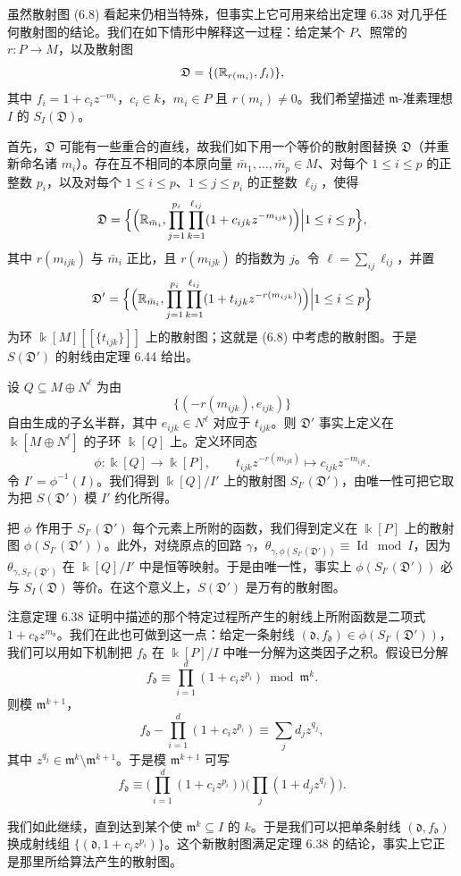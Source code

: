 \begin{remark}
虽然散射图 (6.8) 看起来仍相当特殊，但事实上它可用来给出定理 6.38 对几乎任何散射图的结论。我们在如下情形中解释这一过程：给定某个 $P$、照常的 $r:P\to M$，以及散射图
\[
\mathfrak{D}=\{(\mathbb{R}_{r(m_i)},f_i)\},
\]
其中 $f_i=1+c_iz^{-m_i}$，$c_i\in k$，$m_i\in P$ 且 $r(m_i)\ne0$。我们希望描述 $\mathfrak{m}$-准素理想 $I$ 的 $S_I(\mathfrak{D})$。

首先，$\mathfrak{D}$ 可能有一些重合的直线，故我们如下用一个等价的散射图替换 $\mathfrak{D}$（并重新命名诸 $m_i$）。存在互不相同的本原向量 $\bar m_1,\dots,\bar m_p\in M$、对每个 $1\le i\le p$ 的正整数 $p_i$，以及对每个 $1\le i\le p$、$1\le j\le p_i$ 的正整数 $\ell_{ij}$，使得
\[
\mathfrak{D}=\Big\{\Big(\mathbb{R}_{\bar m_i},\prod_{j=1}^{p_i}\prod_{k=1}^{\ell_{ij}}(1+c_{ijk}z^{-m_{ijk}})\Big)\Big|1\le i\le p\Big\},
\]
其中 $r(m_{ijk})$ 与 $\bar m_i$ 正比，且 $r(m_{ijk})$ 的指数为 $j$。令 $\ell=\sum_{ij}\ell_{ij}$，并置
\[
\mathfrak{D}'=\Big\{\Big(\mathbb{R}_{\bar m_i},\prod_{j=1}^{p_i}\prod_{k=1}^{\ell_{ij}}(1+t_{ijk}z^{-r(m_{ijk})})\Big)\Big|1\le i\le p\Big\}
\]
为环 $ \Bbbk[M][\![\{t_{ijk}\}]\!]$ 上的散射图；这就是 (6.8) 中考虑的散射图。于是 $S(\mathfrak{D}')$ 的射线由定理 6.44 给出。

设 $Q\subseteq M\oplus N^\ell$ 为由
\[
\{(-r(m_{ijk}),e_{ijk})\}
\]
自由生成的子幺半群，其中 $e_{ijk}\in N^\ell$ 对应于 $t_{ijk}$。则 $\mathfrak{D}'$ 事实上定义在 $ \Bbbk[M\oplus N^\ell]$ 的子环 $ \Bbbk[Q]$ 上。定义环同态
\[
\phi: \Bbbk[Q]\to \Bbbk[P],\qquad t_{ijk}z^{-r(m_{ijk})}\mapsto c_{ijk}z^{-m_{ijk}}.
\]
令 $I'=\phi^{-1}(I)$。我们得到 $ \Bbbk[Q]/I'$ 上的散射图 $S_{I'}(\mathfrak{D}')$，由唯一性可把它取为把 $S(\mathfrak{D}')$ 模 $I'$ 约化所得。

把 $\phi$ 作用于 $S_{I'}(\mathfrak{D}')$ 每个元素上所附的函数，我们得到定义在 $\Bbbk[P]$ 上的散射图 $\phi(S_{I'}(\mathfrak{D}'))$。此外，对绕原点的回路 $\gamma$，$\theta_{\gamma,\phi(S_{I'}(\mathfrak{D}'))}\equiv\operatorname{Id}\bmod I$，因为 $\theta_{\gamma,S_{I'}(\mathfrak{D}')}$ 在 $ \Bbbk[Q]/I'$ 中是恒等映射。于是由唯一性，事实上 $\phi(S_{I'}(\mathfrak{D}'))$ 必与 $S_I(\mathfrak{D})$ 等价。在这个意义上，$S(\mathfrak{D}')$ 是万有的散射图。

注意定理 6.38 证明中描述的那个特定过程所产生的射线上所附函数是二项式 $1+c_{\mathfrak{d}}z^{m_{\mathfrak{d}}}$。我们在此也可做到这一点：给定一条射线 $(\mathfrak{d},f_{\mathfrak{d}})\in\phi(S_{I'}(\mathfrak{D}'))$，我们可以用如下机制把 $f_{\mathfrak{d}}$ 在 $\Bbbk[P]/I$ 中唯一分解为这类因子之积。假设已分解
\[
f_{\mathfrak{d}}\equiv\prod_{i=1}^d(1+c_iz^{p_i})\bmod\mathfrak{m}^k.
\]
则模 $\mathfrak{m}^{k+1}$，
\[
f_{\mathfrak{d}}-\prod_{i=1}^d(1+c_iz^{p_i})\equiv\sum_jd_jz^{q_j},
\]
其中 $z^{q_j}\in\mathfrak{m}^k\setminus\mathfrak{m}^{k+1}$。于是模 $\mathfrak{m}^{k+1}$ 可写
\[
f_{\mathfrak{d}}\equiv\Big(\prod_{i=1}^d(1+c_iz^{p_i})\Big)\Big(\prod_j(1+d_jz^{q_j})\Big).
\]

我们如此继续，直到达到某个使 $\mathfrak{m}^k\subseteq I$ 的 $k$。于是我们可以把单条射线 $(\mathfrak{d},f_{\mathfrak{d}})$ 换成射线组 $\{(\mathfrak{d},1+c_iz^{p_i})\}$。这个新散射图满足定理 6.38 的结论，事实上它正是那里所给算法产生的散射图。

\end{remark}


